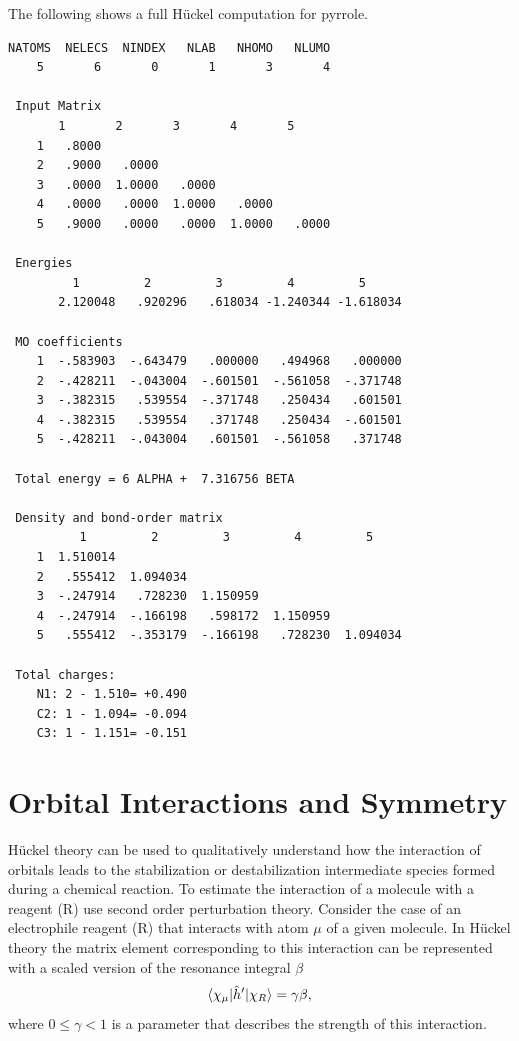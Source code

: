 \documentclass[../Main/chem532-notes.tex]{subfiles}
\begin{document}
\begin{example}
The following shows a full H\"{u}ckel computation for pyrrole. 
\begin{verbatim}
NATOMS  NELECS  NINDEX   NLAB   NHOMO   NLUMO
    5       6       0       1       3       4

 Input Matrix
       1       2       3       4       5
    1   .8000
    2   .9000   .0000
    3   .0000  1.0000   .0000
    4   .0000   .0000  1.0000   .0000
    5   .9000   .0000   .0000  1.0000   .0000

 Energies
         1         2         3         4         5
       2.120048   .920296   .618034 -1.240344 -1.618034

 MO coefficients
    1  -.583903  -.643479   .000000   .494968   .000000
    2  -.428211  -.043004  -.601501  -.561058  -.371748
    3  -.382315   .539554  -.371748   .250434   .601501
    4  -.382315   .539554   .371748   .250434  -.601501
    5  -.428211  -.043004   .601501  -.561058   .371748

 Total energy = 6 ALPHA +  7.316756 BETA

 Density and bond-order matrix
          1         2         3         4         5
    1  1.510014
    2   .555412  1.094034
    3  -.247914   .728230  1.150959
    4  -.247914  -.166198   .598172  1.150959
    5   .555412  -.353179  -.166198   .728230  1.094034

 Total charges:
    N1: 2 - 1.510= +0.490
    C2: 1 - 1.094= -0.094
    C3: 1 - 1.151= -0.151
\end{verbatim}
\end{example}

\section{Orbital Interactions and Symmetry}
H\"{u}ckel theory can be used to qualitatively understand how the interaction of orbitals leads to the stabilization or destabilization intermediate species formed during a chemical reaction.
To estimate the interaction of a molecule with a reagent (R) use second order perturbation theory.
Consider the case of an electrophile reagent (R) that interacts with atom $\mu$ of a given molecule. In H\"{u}ckel theory the matrix element corresponding to this interaction can be represented with a scaled version of the resonance integral $\beta$
\begin{equation}
\braket{\chi_\mu | \hat{h}'| \chi_R} = \gamma \beta,
\end{equation}
where $0 \leq \gamma <1$ is a parameter that describes the strength of this interaction.
\end{document}
